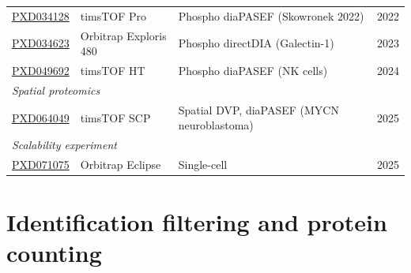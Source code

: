 \documentclass[preprint,12pt]{elsarticle}
\newcommand{\sdrf}[1]{\href{https://github.com/bigbio/sdrf-annotated-datasets/blob/main/datasets/#1/#1.sdrf.tsv}{#1}}
\begin{document}
\begin{table}[htbp]
{\begin{tabular}{ll>{\raggedright\arraybackslash}p{}l}
\sdrf{PXD034128} & timsTOF Pro & Phospho diaPASEF (Skowronek 2022) & 2022 \\
\sdrf{PXD034623} & Orbitrap Exploris 480 & Phospho directDIA (Galectin-1) & 2023 \\
\sdrf{PXD049692} & timsTOF HT & Phospho diaPASEF (NK cells) & 2024 \\
\hline
\multicolumn{4}{l}{\textit{Spatial proteomics}} \\
\sdrf{PXD064049} & timsTOF SCP & Spatial DVP, diaPASEF (MYCN neuroblastoma) & 2025 \\
\hline
\multicolumn{4}{l}{\textit{Scalability experiment}} \\
\sdrf{PXD071075} & Orbitrap Eclipse & Single-cell & 2025 \\
\hline
\end{tabular}}
\end{table}

\section{Identification filtering and protein counting}
\label{sec:supp-filter}
\end{document}
